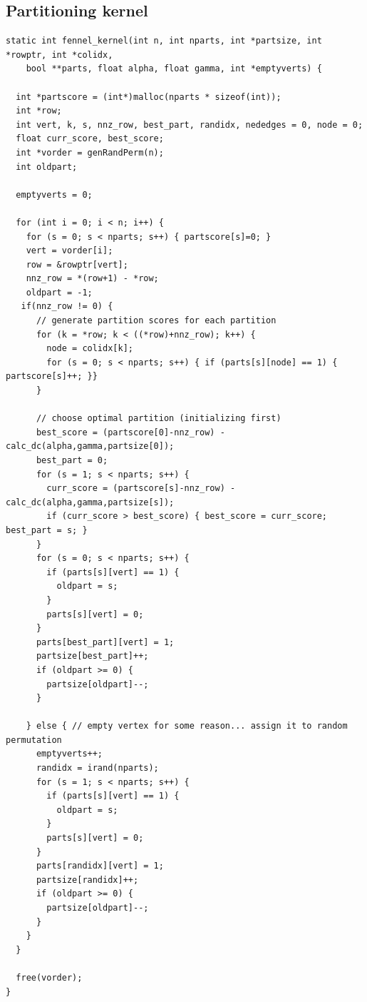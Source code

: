 \documentclass[11pt]{article}
\begin{document}
\subsection*{Partitioning kernel}
\begin{verbatim}
static int fennel_kernel(int n, int nparts, int *partsize, int *rowptr, int *colidx,
    bool **parts, float alpha, float gamma, int *emptyverts) {
      
  int *partscore = (int*)malloc(nparts * sizeof(int));
  int *row;
  int vert, k, s, nnz_row, best_part, randidx, nededges = 0, node = 0;
  float curr_score, best_score;
  int *vorder = genRandPerm(n);
  int oldpart;

  emptyverts = 0;

  for (int i = 0; i < n; i++) {
    for (s = 0; s < nparts; s++) { partscore[s]=0; }
    vert = vorder[i];
    row = &rowptr[vert];
    nnz_row = *(row+1) - *row;
    oldpart = -1;
   if(nnz_row != 0) {
      // generate partition scores for each partition
      for (k = *row; k < ((*row)+nnz_row); k++) {
        node = colidx[k];
        for (s = 0; s < nparts; s++) { if (parts[s][node] == 1) { partscore[s]++; }}
      }
        
      // choose optimal partition (initializing first)
      best_score = (partscore[0]-nnz_row) - calc_dc(alpha,gamma,partsize[0]);
      best_part = 0;
      for (s = 1; s < nparts; s++) {
        curr_score = (partscore[s]-nnz_row) - calc_dc(alpha,gamma,partsize[s]);
        if (curr_score > best_score) { best_score = curr_score; best_part = s; }
      }
      for (s = 0; s < nparts; s++) { 
        if (parts[s][vert] == 1) {
          oldpart = s;
        }
        parts[s][vert] = 0; 
      }
      parts[best_part][vert] = 1;
      partsize[best_part]++;
      if (oldpart >= 0) {
        partsize[oldpart]--;
      }
      
    } else { // empty vertex for some reason... assign it to random permutation
      emptyverts++;
      randidx = irand(nparts);
      for (s = 1; s < nparts; s++) {
        if (parts[s][vert] == 1) {
          oldpart = s;
        }
        parts[s][vert] = 0; 
      }
      parts[randidx][vert] = 1;
      partsize[randidx]++;
      if (oldpart >= 0) {
        partsize[oldpart]--;
      }
    }
  }
  
  free(vorder);
}
\end{verbatim}
\end{document}
